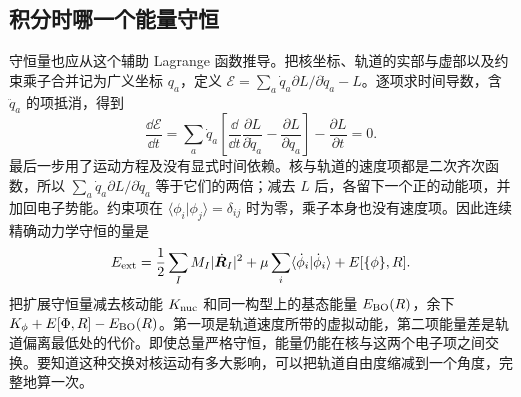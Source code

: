 \subsection{积分时哪一个能量守恒}
守恒量也应从这个辅助 Lagrange 函数推导。把核坐标、轨道的实部与虚部以及约束乘子合并记为广义坐标 $q_a$，定义 $\mathcal E=\sum_a\dot q_a\partial L/\partial\dot q_a-L$。逐项求时间导数，含 $\ddot q_a$ 的项抵消，得到
\begin{equation}
\frac{\dd\mathcal E}{\dd t}
=\sum_a\dot q_a\left[\frac{\dd}{\dd t}\frac{\partial L}{\partial\dot q_a}
-\frac{\partial L}{\partial q_a}\right]-\frac{\partial L}{\partial t}=0.
\end{equation}
最后一步用了运动方程及没有显式时间依赖。核与轨道的速度项都是二次齐次函数，所以 $\sum_a\dot q_a\partial L/\partial\dot q_a$ 等于它们的两倍；减去 $L$ 后，各留下一个正的动能项，并加回电子势能。约束项在 $\langle\phi_i|\phi_j\rangle=\delta_{ij}$ 时为零，乘子本身也没有速度项。因此连续精确动力学守恒的量是
\begin{equation}
E_{\rm ext}=\frac12\sum_I M_I|\dot{\bm R}_I|^2+
\mu\sum_i\langle\dot\phi_i|\dot\phi_i\rangle+E[\{\phi\},R].
\end{equation}
把扩展守恒量减去核动能 $K_{\rm nuc}$ 和同一构型上的基态能量 $E_{\rm BO}(R)$，余下 $K_\phi+E[\Phi,R]-E_{\rm BO}(R)$。第一项是轨道速度所带的虚拟动能，第二项能量差是轨道偏离最低处的代价。即使总量严格守恒，能量仍能在核与这两个电子项之间交换。要知道这种交换对核运动有多大影响，可以把轨道自由度缩减到一个角度，完整地算一次。

